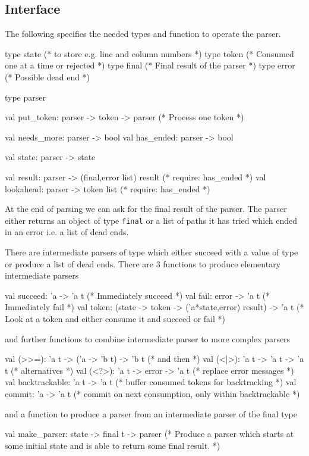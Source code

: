 \subsection{Interface}

The following specifies the needed types and function to operate the parser.
\begin{ocaml}
  type state           (* to store e.g. line and column numbers *)
  type token           (* Consumed one at a time or rejected *)
  type final           (* Final result of the parser *)
  type error           (* Possible dead end *)

  type parser

  val put_token:  parser -> token -> parser  (* Process one token *)

  val needs_more: parser -> bool
  val has_ended:  parser -> bool

  val state:  parser -> state

  val result: parser -> (final,error list) result (* require: has_ended *)
  val lookahead: parser -> token list             (* require: has_ended *)
\end{ocaml}

At the end of parsing we can ask for the final result of the parser. The
parser either returns an object of type \verb!final! or a list of paths it has
tried which ended in an error i.e. a list of dead ends.

There are intermediate parsers of type  which either succeed with a
value of type  or produce a list of dead ends. There are 3 functions
to produce elementary intermediate parsers
%
\begin{ocaml}
  val succeed: 'a -> 'a t            (* Immediately succeed *)
  val fail:    error -> 'a t         (* Immediately fail    *)
  val token:   (state -> token -> ('a*state,error) result) -> 'a t
            (* Look at a token and either consume it and succeed or fail *)
\end{ocaml}
%
and further functions to combine intermediate parser to more complex parsers
%
\begin{ocaml}
  val (>>=): 'a t -> ('a -> 'b t) -> 'b t  (* and then     *)
  val (<|>): 'a t -> 'a t -> 'a t          (* alternatives *)
  val (<?>): 'a t -> error -> 'a t         (* replace error messages *)
  val backtrackable: 'a t -> 'a t          (* buffer consumed tokens for backtracking *)
  val commit: 'a -> 'a t                   (* commit on next consumption,
                                              only within backtrackable *)
\end{ocaml}
%
and a function to produce a parser from an intermediate parser of the final
type
%
\begin{ocaml}
  val make_parser: state -> final t -> parser
  (* Produce a parser which starts at some initial state and is able to
     return some final result. *)
\end{ocaml}


